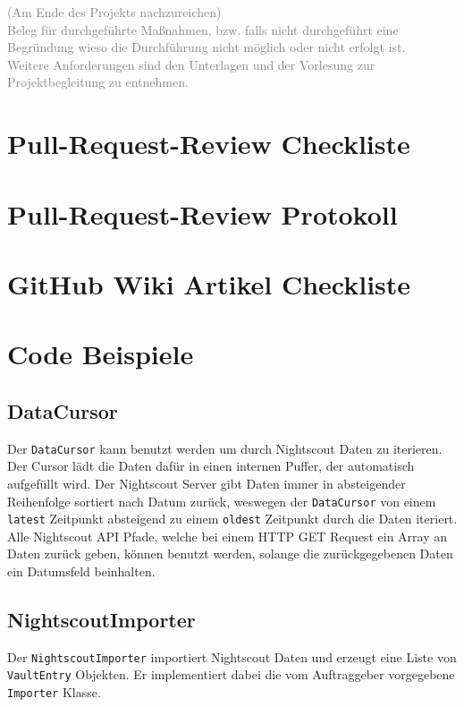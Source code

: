 \documentclass[accentcolor=tud0b,12pt,paper=a4]{tudreport}
\begin{document}
		\textcolor{gray}{(Am Ende des Projekts nachzureichen)}\\
		
		\textcolor{gray}{Beleg für durchgeführte Maßnahmen, bzw. falls nicht durchgeführt eine Begründung wieso die Durchführung nicht möglich oder nicht erfolgt ist. \\
		Weitere Anforderungen sind den Unterlagen und der Vorlesung zur Projektbegleitung zu entnehmen.}
	
	\section{Pull-Request-Review Checkliste}
	
	\section{Pull-Request-Review Protokoll}
	
	\section{GitHub Wiki Artikel Checkliste}
	
\section{Code Beispiele}
\subsection{DataCursor}
Der \texttt{DataCursor} kann benutzt werden um durch Nightscout Daten zu iterieren. Der Cursor lädt die Daten dafür in einen internen Puffer, der automatisch aufgefüllt wird. Der Nightscout Server gibt Daten immer in absteigender Reihenfolge sortiert nach Datum zurück, weswegen der \texttt{DataCursor} von einem \texttt{latest} Zeitpunkt absteigend zu einem \texttt{oldest} Zeitpunkt durch die Daten iteriert. Alle Nightscout API Pfade, welche bei einem HTTP GET Request ein Array an Daten zurück geben, können benutzt werden, solange die zurückgegebenen Daten ein Datumsfeld beinhalten.


\subsection{NightscoutImporter}
Der \texttt{NightscoutImporter} importiert Nightscout Daten und erzeugt eine Liste von \texttt{VaultEntry} Objekten. Er implementiert dabei die vom Auftraggeber vorgegebene \texttt{Importer} Klasse.

\end{document}
